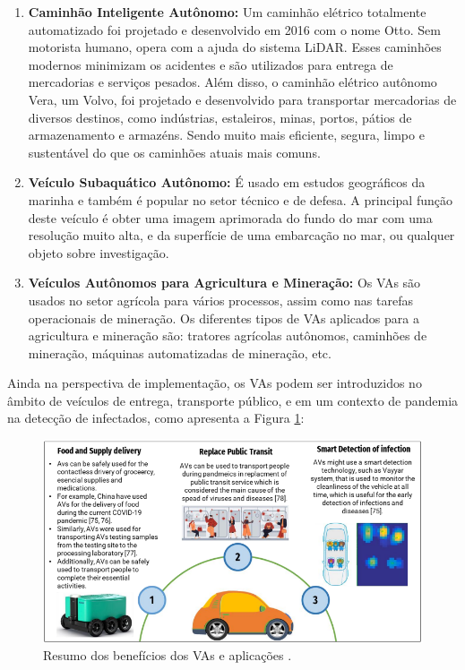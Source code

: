 \begin{enumerate}
\item \textbf{Caminhão Inteligente Autônomo:} Um caminhão elétrico totalmente automatizado foi projetado e desenvolvido em 2016 com o nome Otto. Sem motorista humano, opera com a ajuda do sistema LiDAR. Esses caminhões modernos minimizam os acidentes e são utilizados para entrega de mercadorias e serviços pesados. Além disso, o caminhão elétrico autônomo Vera, um Volvo, foi projetado e desenvolvido para transportar mercadorias de diversos destinos, como indústrias, estaleiros, minas, portos, pátios de armazenamento e armazéns. Sendo muito mais eficiente, segura, limpo e sustentável do que os caminhões atuais mais comuns.

\item \textbf{Veículo Subaquático Autônomo:} É usado em estudos geográficos da marinha e também é popular no setor técnico e de defesa. A principal função deste veículo é obter uma imagem aprimorada do fundo do mar com uma resolução muito alta, e da superfície de uma embarcação no mar, ou qualquer objeto sobre investigação.
\item \textbf{Veículos Autônomos para Agricultura e Mineração:}  Os VAs são usados no setor agrícola para vários processos, assim como nas tarefas operacionais de mineração. Os diferentes tipos de VAs aplicados para a agricultura e mineração são: tratores agrícolas autônomos, caminhões de mineração, máquinas automatizadas de mineração, etc.

\end{enumerate}

Ainda na perspectiva de implementação, os VAs podem ser introduzidos no âmbito de veículos de entrega, transporte público, e em um contexto de pandemia na detecção de infectados, como apresenta a Figura \ref{resumo_aplic}:

\begin{figure}[H]
\centering
\includegraphics[width=\textwidth]{Figures/aplic.png}
\caption{Resumo dos benefícios dos VAs e aplicações \cite{mundobrasil}.}
\label{resumo_aplic}
\end{figure}

